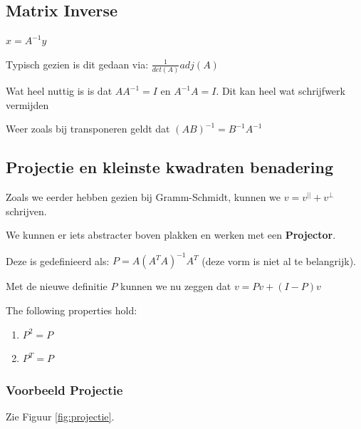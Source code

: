 \documentclass[a4paper]{report}
\begin{document}
\subsection{Matrix Inverse}

$x = A^{-1} y$

Typisch gezien is dit gedaan via: $\frac{1}{det(A)} adj(A)$

Wat heel nuttig is is dat $A A^{-1} = I$ en $A^{-1} A = I$. Dit kan heel wat schrijfwerk vermijden

Weer zoals bij transponeren geldt dat $(AB)^{-1} = B^{-1} A^{-1}$

\subsection{Projectie en kleinste kwadraten benadering}

Zoals we eerder hebben gezien bij Gramm-Schmidt, kunnen we $v= v^{||} + v^{\perp}$ schrijven.

We kunnen er iets abstracter boven plakken en werken met een \textbf{Projector}.

Deze is gedefinieerd als: $P = A (A^T A)^{-1} A^T$ (deze vorm is niet al te belangrijk).

Met de nieuwe definitie $P$ kunnen we nu zeggen dat $v = Pv + (I - P)v$

The following properties hold:

\begin{enumerate}
	\item $P^2 = P$
	\item $P^T = P$
\end{enumerate}

\subsubsection{Voorbeeld Projectie}

Zie Figuur \ref{fig:projectie}.
\end{document}

